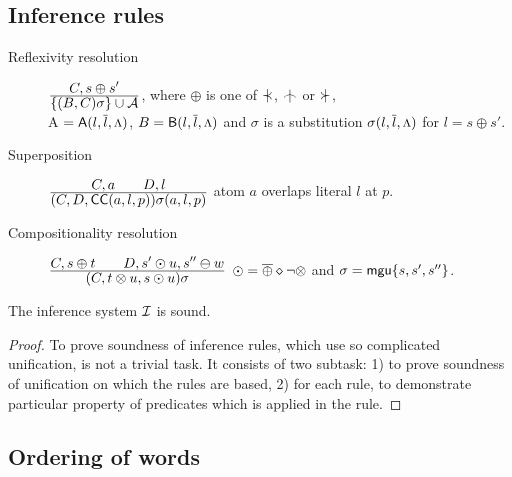 \subsection{Inference rules}

\begin{description}
\item[Reflexivity resolution]\quad\({\displaystyle C,s\oplus s' \over \displaystyle\{(B,C)\sigma\}\cup \mbox {$\cal A$}}\), 
\quad
where \(\oplus\) is one of \(\notIncl\), \(\notInt\) or \(\notCont\),\\[.5ex]
\C A \(={\sf A}(l,\overline{l},\mbox{\footnotesize$\Lambda$})\),
\(B={\sf B}(l,\overline{l},\mbox{\footnotesize$\Lambda$})\) and
$\sigma$ is a substitution \(\sigma(l,\overline{l},\mbox{\footnotesize$\Lambda$})\) for \(l= s\oplus s'\).

\item[Superposition]\quad \({\displaystyle C,a \qquad D,l \over \displaystyle(C,D,{\sf CC}(a,l,p))\sigma(a,l,p)}\) \quad 
atom \(a\) overlaps literal \(l\) at $p$.

\item[Compositionality resolution]
\quad \({\displaystyle C,s\oplus t \qquad D,s'\odot u,s''\ominus w \over \displaystyle(C,t\otimes u,s\odot u)\sigma}\) \quad
 \(\odot = \overline{\oplus}\diamond\neg\otimes\) and
\(\sigma={\sf mgu}\{s,s',s''\}\).
\end{description}

\begin{theorem} \label{th:soundness}
The inference system $\mbox {$\cal I$}$ is sound.
\end{theorem}
\begin{proof} 
To prove soundness of inference rules, which use so complicated
unification, is not a trivial task. It consists of two subtask: 1) to prove
soundness of unification on which the rules are based, 2) for each rule, to
demonstrate particular property of predicates which is applied in the rule.
\end{proof}

\subsection{Ordering of words}


